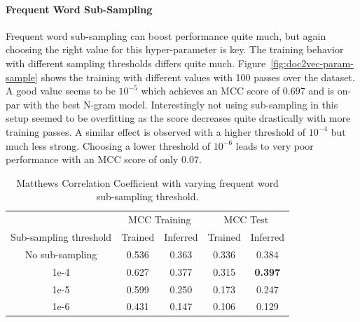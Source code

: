 \paragraph{Frequent Word Sub-Sampling}
Frequent word sub-sampling can boost performance quite much, but again choosing the right value for this hyper-parameter is key. The training behavior with different sampling thresholds differs quite much. Figure~\ref{fig:doc2vec-param-sample} shows the training with different values with 100 passes over the dataset. A good value seems to be $10^{-5}$ which achieves an MCC score of 0.697 and is on-par with the best N-gram model. Interestingly not using sub-sampling in this setup seemed to be overfitting as the score decreases quite drastically with more training passes. A similar effect is observed with a higher threshold of $10^{-4}$ but much less strong. Choosing a lower threshold of $10^{-6}$ leads to very poor performance with an MCC score of only 0.07.

\begin{table}[h]
  \begin{center}
    \begin{tabular}{ c | *2c | *2c }
      \toprule
       & \multicolumn{2}{c|}{MCC Training} & \multicolumn{2}{|c}{MCC Test}\\
      Sub-sampling threshold & Trained & Inferred & Trained & Inferred \\
      \midrule
      No sub-sampling & 0.536 & 0.363 & 0.336 & 0.384 \\
      1e-4 & 0.627 & 0.377 & 0.315 & \textbf{0.397} \\
      1e-5 & 0.599 & 0.250 & 0.173 & 0.247 \\
      1e-6 & 0.431 & 0.147 & 0.106 & 0.129 \\
    \bottomrule
  \end{tabular}
  \caption{Matthews Correlation Coefficient with varying frequent word sub-sampling threshold.}
\label{tab:Paragraph Vector Parameter Results Sample}
\end{center}
\end{table}

